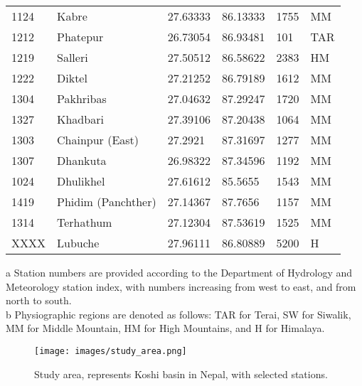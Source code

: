\begin{table}[H]
\begin{tabularx}{\textwidth}{|X|X|X|X|X|X|}
      1124 & Kabre             & 27.63333 & 86.13333 & 1755 & MM \\
      1212 & Phatepur          & 26.73054 & 86.93481 & 101  & TAR \\
      1219 & Salleri           & 27.50512 & 86.58622 & 2383 & HM \\
      1222 & Diktel            & 27.21252 & 86.79189 & 1612 & MM \\
      1304 & Pakhribas         & 27.04632 & 87.29247 & 1720 & MM \\
      1327 & Khadbari          & 27.39106 & 87.20438 & 1064 & MM \\
      1303 & Chainpur (East)   & 27.2921  & 87.31697 & 1277 & MM \\
      1307 & Dhankuta          & 26.98322 & 87.34596 & 1192 & MM \\
      1024 & Dhulikhel         & 27.61612 & 85.5655  & 1543 & MM \\
      1419 & Phidim (Panchther) & 27.14367 & 87.7656  & 1157 & MM \\
      1314 & Terhathum         & 27.12304 & 87.53619 & 1525 & MM \\
      XXXX & Lubuche           & 27.96111 & 86.80889 & 5200 & H \\
      \bottomrule %
  \end{tabularx}
  \begin{flushleft}
      \footnotesize{a Station numbers are provided according to the Department of Hydrology and Meteorology station index, with numbers increasing from west to east, and from north to south.} \\
      \footnotesize{b Physiographic regions are denoted as follows: TAR for Terai, SW for Siwalik, MM for Middle Mountain, HM for High Mountains, and H for Himalaya.}
  \end{flushleft}
\end{table}


\begin{figure}[H]  
  \centering
  \texttt{[image: images/study\_area.png]} 
  \caption{Study area, represents Koshi basin in Nepal, with selected stations.}  
  \label{fig:study_area} 
\end{figure}


